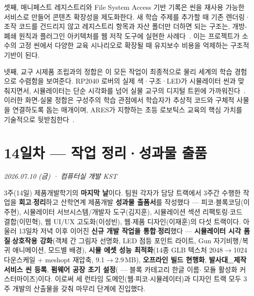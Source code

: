 셋째, 매니페스트 레지스트리와 File System Access 기반 기록은 씬을 재사용 가능한 서비스로 만들어 콘텐츠 확장성을 제도화한다. 새 학습 주제를 추가할 때 기존 렌더링·조작 코드를 건드리지 않고 레지스트리 항목과 자산 폴더만 더하면 되는 구조는, 개방-폐쇄 원칙과 플러그인 아키텍처를 웹 저작 도구에 실현한 사례다~\cite{gof1994,martin2008cleancode}. 이는 프로젝트가 소수의 고정 씬에서 다양한 교육 시나리오로 확장될 때 유지보수 비용을 억제하는 구조적 기반이 된다.

넷째, 교구 시제품 조립과의 정합은 이 모든 작업이 최종적으로 물리 세계의 학습 경험으로 수렴함을 보여준다. RP2040 로버의 실제 색·구조·LED가 시뮬레이터 씬과 맞춰지면서, 시뮬레이터는 단순 시각화를 넘어 실물 교구의 디지털 트윈에 가까워진다~\cite{rp2040,papert1980}. 이러한 화면-실물 정합은 구성주의 학습 관점에서 학습자가 추상적 코드와 구체적 사물을 연결하도록 돕는 매개이며, ARES가 지향하는 초등 로보틱스 교육의 핵심 가치를 기술적으로 뒷받침한다~\cite{papert1980,resnick2009scratch}.

\chapter{14일차 — 작업 정리·성과물 출품}
\textit{2026.07.10 (금) · 컴퓨터실 개발 KST}

\begin{summarybox}
3주(14일) 제품개발학기의 \textbf{마지막 날}이다. 팀원 각자가 담당 트랙에서 3주간
수행한 작업을 \textbf{회고$\cdot$정리}하고 산학연계 제품개발 \textbf{성과물 출품서}를
작성했다 --- 피코$\cdot$블록코딩(이주현), 시뮬레이터 서브시스템/개발자 도구(김지훈),
시뮬레이션 섹션 리팩토링$\cdot$코드 결합(이민혁), 웹 UI/UX 고도화(이성빈), 웹$\cdot$제품
디자인(이재훈)의 다섯 트랙이다. 아울러 13일차 저녁 이후 이어진 \textbf{신규 개발
작업을 통합$\cdot$정리}했다 --- \textbf{시뮬레이터 시각 품질$\cdot$상호작용 강화}(객체 간
그림자 선명화, LED 점등 포인트 라이트, Gun 자기비행/복귀 애니메이션, 모드별 배경),
\textbf{시뮬 에셋 성능 최적화}(14종 GLB 텍스처 2048$\to$1024 다운스케일 + meshopt 재압축,
9.1$\to$2.9\,MB), \textbf{오프라인  빌드 현행화}, \textbf{발사대\_제작 서비스
씬 등록}, \textbf{펌웨어 공장 초기 설정}( --- 블록 카테고리 한글 이름$\cdot$%
모듈 활성화 커스터마이즈)이다. 이로써 세 런타임 도메인(웹$\cdot$피코$\cdot$시뮬레이터)과
디자인 트랙 모두 3주 개발의 산출물을 갖춰 마무리 단계에 진입했다.
\end{summarybox}

